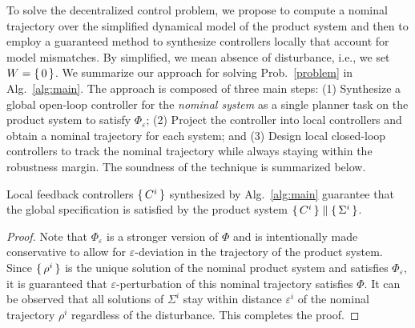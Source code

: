 

To solve the decentralized control problem, 
we propose to compute a nominal trajectory over the simplified dynamical model of the product system and then to
employ a guaranteed method to synthesize controllers locally that account for model mismatches. 
By simplified, we mean absence of disturbance, i.e., we set $W=\set{0}$.
We summarize our approach for solving Prob.~\ref{problem} in Alg.~\ref{alg:main}.
The approach is composed of three main steps:
(1) Synthesize a global open-loop controller for the \emph{nominal system} as a single planner task on the product system to satisfy $\Phi_\varepsilon$;
(2) Project the controller into local controllers and obtain a nominal trajectory for each system; and
(3) Design local closed-loop controllers to track the nominal trajectory while always staying within the robustness margin.
The soundness of the technique is summarized below.

\begin{theorem}
Local feedback controllers $\set{C^i}$ synthesized by Alg.~\ref{alg:main} guarantee that the global specification is satisfied by the product system $\set{C^i}\parallel \set{\Sigma^i}$. 
\end{theorem}
\begin{proof}
Note that $\Phi_\varepsilon$ is a stronger version of $\Phi$ and is intentionally made conservative to allow for $\varepsilon$-deviation in the trajectory of the product system.
Since $\set{\rho^i}$ is the unique solution of the nominal product system and satisfies $\Phi_\varepsilon$, it is guaranteed that $\varepsilon$-perturbation of this nominal trajectory satisfies $\Phi$.
It can be observed that all solutions of $\Sigma^i$ stay within distance $\varepsilon^i$ of the nominal trajectory 
$\rho^i$ regardless of the disturbance. 
This completes the proof.
\end{proof}

